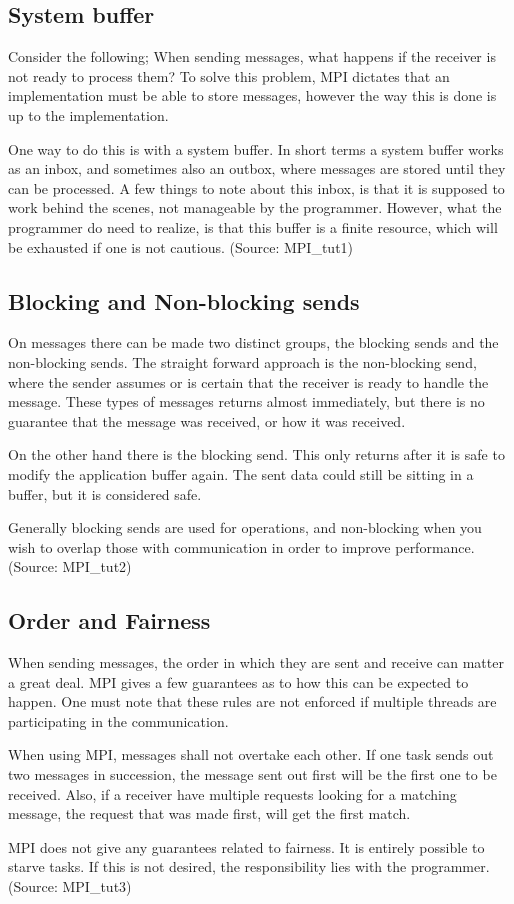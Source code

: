 \subsection{System buffer}
Consider the following; When sending messages, what happens if the receiver is not ready to process them? To solve this problem, MPI dictates that an implementation must be able to store messages, however the way this is done is up to the implementation.

One way to do this is with a system buffer. In short terms a system buffer works as an inbox, and sometimes also an outbox, where messages are stored until they can be processed. A few things to note about this inbox, is that it is supposed to work behind the scenes, not manageable by the programmer. However, what the programmer do need to realize, is that this buffer is a finite resource, which will be exhausted if one is not cautious.
(Source: MPI_tut1)

\subsection{Blocking and Non-blocking sends}
On messages there can be made two distinct groups, the blocking sends and the non-blocking sends. The straight forward approach is the non-blocking send, where the sender assumes or is certain that the receiver is ready to handle the message. These types of messages returns almost immediately, but there is no guarantee that the message was received, or how it was received.

On the other hand there is the blocking send. This only returns after it is safe to modify the application buffer again. The sent data could still be sitting in a buffer, but it is considered safe.

Generally blocking sends are used for operations, and non-blocking when you wish to overlap those with communication in order to improve performance.
(Source: MPI_tut2)

\subsection{Order and Fairness}
When sending messages, the order in which they are sent and receive can matter a great deal. MPI gives a few guarantees as to how this can be expected to happen. One must note that these rules are not enforced if multiple threads are participating in the communication.

When using MPI, messages shall not overtake each other. If one task sends out two messages in succession, the message sent out first will be the first one to be received. Also, if a receiver have multiple requests looking for a matching message, the request that was made first, will get the first match.

MPI does not give any guarantees related to fairness. It is entirely possible to starve tasks. If this is not desired, the responsibility lies with the programmer.
(Source: MPI_tut3)